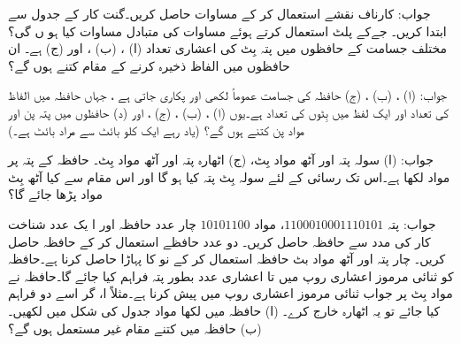  جواب: 
 کارناف نقشے  استعمال  کر کے  مساوات  حاصل کریں۔گنت کار کے جدول سے ابتدا کریں۔
جےکے پلٹ استعمال کرتے ہوئے  مساوات   کی متبادل مساوات   کیا ہو ں گی؟
  مختلف جسامت کے حافظوں میں پتہ بِٹ  کی  اعشاری تعداد  (ا) ، (ب) ، اور  (ج)   ہے۔  ان حافظوں میں الفاظ ذخیرہ کرنے کے  مقام کتنے  ہوں گے؟
  
  جواب: (ا)  ، (ب) ، (ج) 
 حافظہ کی  جسامت  عموماً  لکھی اور پکاری جاتی ہے ، جہاں   حافظہ میں الفاظ کی تعداد اور  ایک لفظ میں بِٹوں کی تعداد  ہے۔یوں  (ا) ،  (ب)   ، (ج)  ، اور (د)     حافظوں میں پتہ پن  اور  مواد پن کتنے  ہوں گے؟ (یاد رہے  ایک کلو بائٹ سے مراد    بائٹ ہے۔)
 
 جواب: (ا)    سولہ  پتہ اور  آٹھ مواد بِٹ، (ج)  اٹھارہ پتہ اور آٹھ مواد بِٹ۔
 حافظہ کے   پتہ  پر  مواد لکھا ہے۔اس تک رسائی کے لئے سولہ بِٹ  پتہ کیا ہو گا اور اس  مقام سے کیا  آٹھ  بِٹ مواد  پڑھا جائے گا؟
 
 جواب: پتہ   \(1100010001110101\)،   مواد  \(10101100\)
 چار عدد  حافظہ  اور ا یک عدد  شناخت کار کی مدد سے  حافظہ حاصل کریں۔
 دو عدد  حافظے  استعمال  کر کے  حافظہ حاصل کریں۔
 چار پتہ  اور آٹھ مواد بٹ حافظہ استعمال کر کے  نو کا  پہاڑا حاصل کرنا ہے۔حافظہ کو  ثنائی مرموز اعشاری  روپ میں  تا  اعشاری عدد بطور پتہ فراہم کیا جائے گا۔حافظہ نے مواد  بِٹ پر جواب ثنائی  مرموز اعشاری  روپ میں پیش کرنا ہے۔مثلاً ا، گر اسے دو  فراہم کیا جائے تو یہ اٹھارہ   خارج کرے۔ (ا) حافظہ میں لکھا مواد جدول کی شکل میں لکھیں۔ (ب) حافظہ میں کتنے مقام غیر مستعمل ہوں گے؟ 
 
